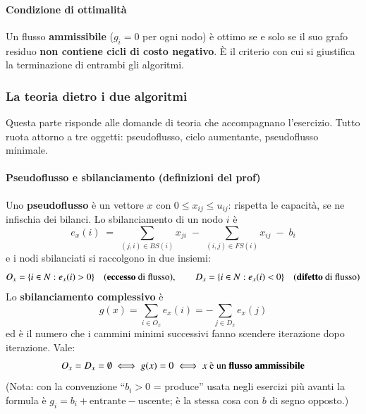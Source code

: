 \documentclass[12pt]{extarticle} %
\begin{document}
\paragraph{Condizione di ottimalità}
Un flusso \textbf{ammissibile} ($g_i = 0$ per ogni nodo) è ottimo se e solo se il suo grafo residuo \textbf{non contiene cicli di costo negativo}. È il criterio con cui si giustifica la terminazione di entrambi gli algoritmi.

\subsubsection{La teoria dietro i due algoritmi}
Questa parte risponde alle domande di teoria che accompagnano l'esercizio. Tutto ruota attorno a tre oggetti: pseudoflusso, ciclo aumentante, pseudoflusso minimale.

\paragraph{Pseudoflusso e sbilanciamento (definizioni del prof)}
Uno \textbf{pseudoflusso} è un vettore $x$ con $0 \le x_{ij} \le u_{ij}$: rispetta le capacità, se ne infischia dei bilanci. Lo sbilanciamento di un nodo $i$ è
\[
e_x(i) \;=\; \sum_{(j,i)\in BS(i)} x_{ji} \;-\; \sum_{(i,j)\in FS(i)} x_{ij} \;-\; b_i
\]
e i nodi sbilanciati si raccolgono in due insiemi:
\[
O_x = \{i \in N : e_x(i) > 0\} \quad \text{(\textbf{eccesso} di flusso)}, \qquad
D_x = \{i \in N : e_x(i) < 0\} \quad \text{(\textbf{difetto} di flusso)}
\]
Lo \textbf{sbilanciamento complessivo} è
\[
g(x) = \sum_{i \in O_x} e_x(i) = -\sum_{j \in D_x} e_x(j)
\]
ed è il numero che i cammini minimi successivi fanno scendere iterazione dopo iterazione. Vale:
\[
O_x = D_x = \emptyset \iff g(x) = 0 \iff x \text{ è un \textbf{flusso ammissibile}}
\]
\noindent (Nota: con la convenzione ``$b_i>0$ = produce'' usata negli esercizi più avanti la formula è $g_i = b_i + \text{entrante} - \text{uscente}$; è la stessa cosa con $b$ di segno opposto.)
\end{document}

